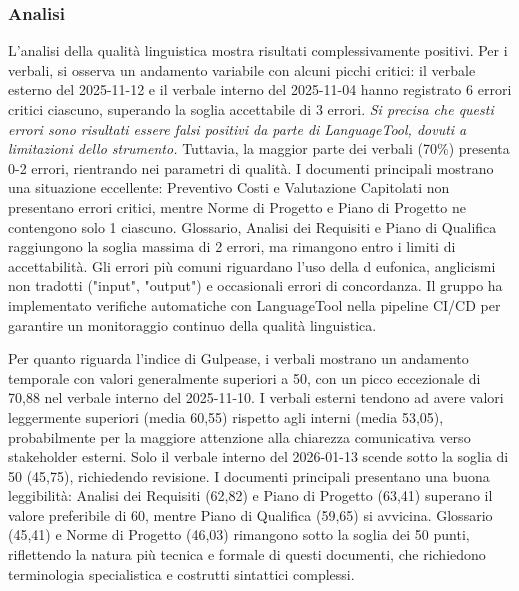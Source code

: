 \documentclass[a4paper,11pt,oneside]{scrartcl}
\begin{document}
\subsubsection*{Analisi}

L'analisi della qualità linguistica mostra risultati complessivamente positivi. Per i verbali, si osserva un andamento variabile con alcuni picchi critici: il verbale esterno del 2025-11-12 e il verbale interno del 2025-11-04 hanno registrato 6 errori critici ciascuno, superando la soglia accettabile di 3 errori. \textit{Si precisa che questi errori sono risultati essere falsi positivi da parte di LanguageTool, dovuti a limitazioni dello strumento.} Tuttavia, la maggior parte dei verbali (70\%) presenta 0-2 errori, rientrando nei parametri di qualità. I documenti principali mostrano una situazione eccellente: Preventivo Costi e Valutazione Capitolati non presentano errori critici, mentre Norme di Progetto e Piano di Progetto ne contengono solo 1 ciascuno. Glossario, Analisi dei Requisiti e Piano di Qualifica raggiungono la soglia massima di 2 errori, ma rimangono entro i limiti di accettabilità. Gli errori più comuni riguardano l'uso della d eufonica, anglicismi non tradotti ("input", "output") e occasionali errori di concordanza. Il gruppo ha implementato verifiche automatiche con LanguageTool nella pipeline CI/CD per garantire un monitoraggio continuo della qualità linguistica.

Per quanto riguarda l'indice di Gulpease, i verbali mostrano un andamento temporale con valori generalmente superiori a 50, con un picco eccezionale di 70,88 nel verbale interno del 2025-11-10. I verbali esterni tendono ad avere valori leggermente superiori (media 60,55) rispetto agli interni (media 53,05), probabilmente per la maggiore attenzione alla chiarezza comunicativa verso stakeholder esterni. Solo il verbale interno del 2026-01-13 scende sotto la soglia di 50 (45,75), richiedendo revisione. I documenti principali presentano una buona leggibilità: Analisi dei Requisiti (62,82) e Piano di Progetto (63,41) superano il valore preferibile di 60, mentre Piano di Qualifica (59,65) si avvicina. Glossario (45,41) e Norme di Progetto (46,03) rimangono sotto la soglia dei 50 punti, riflettendo la natura più tecnica e formale di questi documenti, che richiedono terminologia specialistica e costrutti sintattici complessi.
\end{document}
